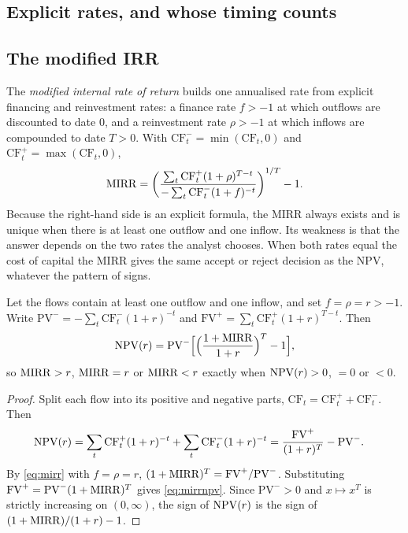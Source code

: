 \begin{chapterrefs}
\section{Explicit rates, and whose timing counts}
\label{sec:mirr}

\subsection{The modified IRR}

The \emph{modified internal rate of return} builds one annualised rate from explicit financing and
reinvestment rates: a finance rate $f>-1$ at which outflows are discounted to date $0$, and a
reinvestment rate $\rho>-1$ at which inflows are compounded to date $T>0$. With $\mathrm{CF}_t^- = \min(\mathrm{CF}_t,0)$
and $\mathrm{CF}_t^+ = \max(\mathrm{CF}_t,0)$,
\begin{equation}\label{eq:mirr}
  \mathrm{MIRR} = \left(\frac{\sum_t \mathrm{CF}_t^+(1+\rho)^{T-t}}{-\sum_t \mathrm{CF}_t^-(1+f)^{-t}}\right)^{1/T}-1 .
\end{equation}
Because the right-hand side is an explicit formula, the MIRR always exists and is unique when there is
at least one outflow and one inflow. Its weakness is that the answer depends on the two rates the
analyst chooses. When both rates equal the cost of capital the MIRR gives the same accept or reject
decision as the NPV, whatever the pattern of signs.

\begin{proposition}\label{prop:mirr}
Let the flows contain at least one outflow and one inflow, and set $f=\rho=r>-1$. Write
$\mathrm{PV}^- = -\sum_t\mathrm{CF}_t^-(1+r)^{-t}$ and $\mathrm{FV}^+ = \sum_t\mathrm{CF}_t^+(1+r)^{T-t}$.
Then
\begin{equation}\label{eq:mirrnpv}
  \operatorname{NPV}(r) = \mathrm{PV}^-\Bigl[\Bigl(\frac{1+\mathrm{MIRR}}{1+r}\Bigr)^{T}-1\Bigr],
\end{equation}
so $\mathrm{MIRR}>r$, $\mathrm{MIRR}=r$ or $\mathrm{MIRR}<r$ exactly when $\operatorname{NPV}(r)>0$, $=0$ or $<0$.
\end{proposition}

\begin{proof}
Split each flow into its positive and negative parts, $\mathrm{CF}_t = \mathrm{CF}_t^+ + \mathrm{CF}_t^-$.
Then
\begin{align*}
  \operatorname{NPV}(r) &= \sum_t \mathrm{CF}_t^+(1+r)^{-t} + \sum_t \mathrm{CF}_t^-(1+r)^{-t}
           = \frac{\mathrm{FV}^+}{(1+r)^T} - \mathrm{PV}^- .
\end{align*}
By \cref{eq:mirr} with $f=\rho=r$, $(1+\mathrm{MIRR})^T = \mathrm{FV}^+/\mathrm{PV}^-$. Substituting
$\mathrm{FV}^+ = \mathrm{PV}^-(1+\mathrm{MIRR})^T$ gives \cref{eq:mirrnpv}. Since $\mathrm{PV}^->0$ and
$x\mapsto x^T$ is strictly increasing on $(0,\infty)$, the sign of $\operatorname{NPV}(r)$ is the sign of
$(1+\mathrm{MIRR})/(1+r)-1$.
\end{proof}


\end{chapterrefs}
